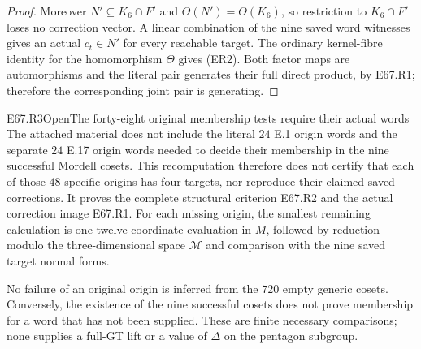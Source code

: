 \begin{proof}
Moreover $N'\subseteq K_6\cap F'$ and
$\Theta(N')=\Theta(K_6)$, so restriction to $K_6\cap F'$ loses
no correction vector. A linear combination of the nine saved
word witnesses gives an actual $c_t\in N'$ for every reachable
target. The ordinary kernel-fibre identity for the homomorphism
$\Theta$ gives (ER2). Both factor maps are automorphisms and the
literal pair generates their full direct product, by E67.R1;
therefore the corresponding joint pair is generating.
\end{proof}

\begin{statement}{E67.R3}{Open}{The forty-eight original membership tests require their actual words}
The attached material does not include the literal $24$ E.1
origin words and the separate $24$ E.17 origin words needed to
decide their membership in the nine successful Mordell cosets.
This recomputation therefore does not certify that each of those
$48$ specific origins has four targets, nor reproduce their
claimed saved corrections. It proves the complete structural
criterion E67.R2 and the actual correction image E67.R1.
For each missing origin, the smallest remaining calculation is
one twelve-coordinate evaluation in $M$, followed by reduction
modulo the three-dimensional space $\mathcal M$ and comparison
with the nine saved target normal forms.
\end{statement}
No failure of an original origin is inferred from the $720$ empty
generic cosets. Conversely, the existence of the nine successful
cosets does not prove membership for a word that has not been supplied.
These are finite necessary comparisons; none supplies a full-GT
lift or a value of $\Delta$ on the pentagon subgroup.
